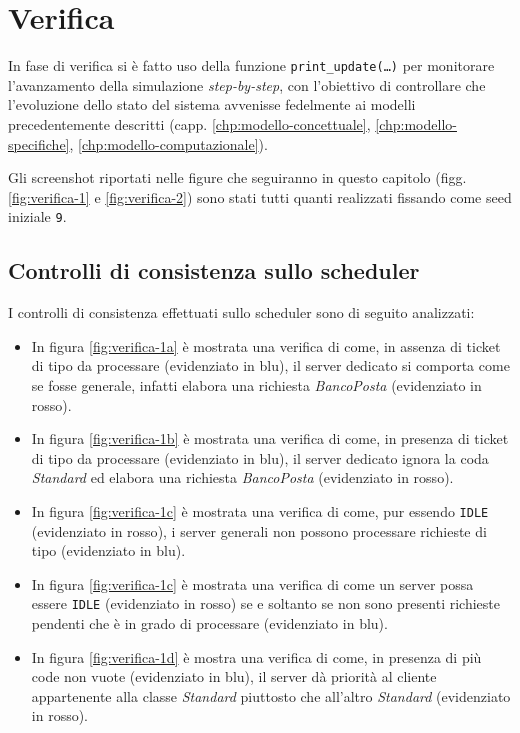 \chapter{Verifica}\label{chp:verifica}
In fase di verifica si è fatto uso della funzione \texttt{print\_update(\dots)} per monitorare l'avanzamento della simulazione \textit{step-by-step}, con l'obiettivo di controllare che l'evoluzione dello stato del sistema avvenisse fedelmente ai modelli precedentemente descritti (capp. \ref{chp:modello-concettuale}, \ref{chp:modello-specifiche}, \ref{chp:modello-computazionale}).

Gli screenshot riportati nelle figure che seguiranno in questo capitolo (figg. \ref{fig:verifica-1} e \ref{fig:verifica-2}) sono stati tutti quanti realizzati fissando come seed iniziale \texttt{9}.

\section{Controlli di consistenza sullo scheduler}
I controlli di consistenza effettuati sullo scheduler sono di seguito analizzati:
\begin{itemize}
\item In figura \ref{fig:verifica-1a} è mostrata una verifica di come, in assenza di ticket di tipo \sr{} da processare (evidenziato in {\color{verify_blue}blu}), il server dedicato si comporta come se fosse generale, infatti elabora una richiesta \pp{} \textsl{BancoPosta} (evidenziato in {\color{verify_red}rosso}).
\item In figura \ref{fig:verifica-1b} è mostrata una verifica di come, in presenza di ticket di tipo \sr{} da processare (evidenziato in {\color{verify_blue}blu}), il server dedicato ignora la coda \pp{} \textsl{Standard} ed elabora una richiesta \sr{} \textsl{BancoPosta} (evidenziato in {\color{verify_red}rosso}).
\item In figura \ref{fig:verifica-1c} è mostrata una verifica di come, pur essendo \texttt{IDLE} (evidenziato in {\color{verify_red}rosso}), i server generali non possono processare richieste di tipo \sr{} (evidenziato in {\color{verify_blue}blu}).
\item In figura \ref{fig:verifica-1c} è mostrata una verifica di come un server possa essere \texttt{IDLE} (evidenziato in {\color{verify_red}rosso}) se e soltanto se non sono presenti richieste pendenti che è in grado di processare (evidenziato in {\color{verify_blue}blu}).
\item In figura \ref{fig:verifica-1d} è mostra una verifica di come, in presenza di più code non vuote (evidenziato in {\color{verify_blue}blu}), il server dà priorità al cliente appartenente alla classe \uo{} \textsl{Standard} piuttosto che all'altro \pp{} \textsl{Standard} (evidenziato in {\color{verify_red}rosso}).
\end{itemize}

